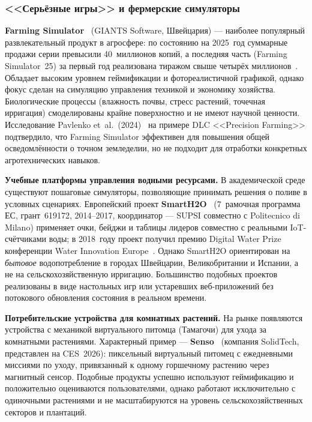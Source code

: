 \subsubsection{<<Серьёзные игры>> и фермерские симуляторы}

\textbf{Farming Simulator}~\cite{farming_simulator_official} (GIANTS
Software, Швейцария) --- наиболее популярный развлекательный продукт
в агросфере: по состоянию на 2025~год суммарные продажи серии превысили
40~миллионов копий, а последняя часть (Farming Simulator~25) за первый
год реализована тиражом свыше четырёх
миллионов~\cite{giants_fs25_4million}. Обладает высоким уровнем
геймификации и фотореалистичной графикой, однако фокус сделан на
симуляцию управления техникой и экономику хозяйства. Биологические
процессы (влажность почвы, стресс растений, точечная ирригация)
смоделированы крайне поверхностно и не имеют научной ценности.
Исследование Pavlenko et~al.~(2024)~\cite{pavlenko_2024_sciencedirect,pavlenko_2024_centaur_reading}
на примере DLC <<Precision Farming>> подтвердило, что Farming Simulator
эффективен для повышения общей осведомлённости о точном земледелии,
но не подходит для отработки конкретных агротехнических навыков.

\textbf{Учебные платформы управления водными ресурсами.} В академической
среде существуют пошаговые симуляторы, позволяющие принимать решения
о поливе в условных сценариях. Европейский проект
\textbf{SmartH2O}~\cite{smarth2o_cordis} (7~рамочная программа ЕС,
грант~619172, 2014--2017, координатор --- SUPSI совместно с Politecnico
di Milano) применяет очки, бейджи и таблицы лидеров совместно с
реальными IoT-счётчиками воды; в 2018~году проект получил премию
Digital Water Prize конференции Water Innovation
Europe~\cite{smarth2o_digital_water_prize_ec}. Однако SmartH2O
ориентирован на \emph{бытовое} водопотребление в городах Швейцарии,
Великобритании и Испании, а не на сельскохозяйственную ирригацию.
Большинство подобных проектов реализованы в виде настольных игр или
устаревших веб-приложений без потокового обновления состояния в
реальном времени.

\textbf{Потребительские устройства для комнатных растений.} На рынке
появляются устройства с механикой виртуального питомца (Тамагочи) для
ухода за комнатными растениями. Характерный пример ---
\textbf{Senso}~\cite{senso_solidtech_prelaunch,senso_engadget_ces2026}
(компания SolidTech, представлен на CES~2026): пиксельный виртуальный
питомец с ежедневными миссиями по уходу, привязанный к одному
горшечному растению через магнитный сенсор. Подобные продукты успешно
используют геймификацию и положительно оцениваются пользователями,
однако работают исключительно с одиночными растениями и не
масштабируются на уровень сельскохозяйственных секторов и плантаций.

